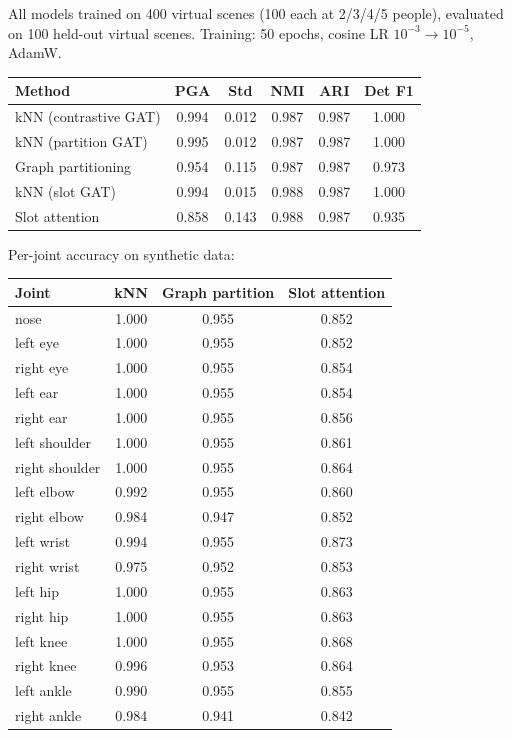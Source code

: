 All models trained on 400 virtual scenes (100 each at 2/3/4/5 people), evaluated on 100 held-out virtual scenes. Training: 50 epochs, cosine LR $10^{-3} \to 10^{-5}$, AdamW.

\begin{center}
\begin{tabular}{lccccc}
\toprule
Method & PGA & Std & NMI & ARI & Det F1 \\
\midrule
kNN (contrastive GAT) & 0.994 & 0.012 & 0.987 & 0.987 & 1.000 \\
kNN (partition GAT) & 0.995 & 0.012 & 0.987 & 0.987 & 1.000 \\
Graph partitioning & 0.954 & 0.115 & 0.987 & 0.987 & 0.973 \\
kNN (slot GAT) & 0.994 & 0.015 & 0.988 & 0.987 & 1.000 \\
Slot attention & 0.858 & 0.143 & 0.988 & 0.987 & 0.935 \\
\bottomrule
\end{tabular}
\end{center}

Per-joint accuracy on synthetic data:

\begin{center}
\small
\begin{tabular}{lccc}
\toprule
Joint & kNN & Graph partition & Slot attention \\
\midrule
nose & 1.000 & 0.955 & 0.852 \\
left eye & 1.000 & 0.955 & 0.852 \\
right eye & 1.000 & 0.955 & 0.854 \\
left ear & 1.000 & 0.955 & 0.854 \\
right ear & 1.000 & 0.955 & 0.856 \\
left shoulder & 1.000 & 0.955 & 0.861 \\
right shoulder & 1.000 & 0.955 & 0.864 \\
left elbow & 0.992 & 0.955 & 0.860 \\
right elbow & 0.984 & 0.947 & 0.852 \\
left wrist & 0.994 & 0.955 & 0.873 \\
right wrist & 0.975 & 0.952 & 0.853 \\
left hip & 1.000 & 0.955 & 0.863 \\
right hip & 1.000 & 0.955 & 0.863 \\
left knee & 1.000 & 0.955 & 0.868 \\
right knee & 0.996 & 0.953 & 0.864 \\
left ankle & 0.990 & 0.955 & 0.855 \\
right ankle & 0.984 & 0.941 & 0.842 \\
\bottomrule
\end{tabular}
\end{center}

